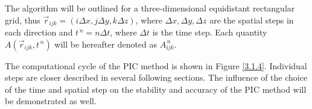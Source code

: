 The algorithm will be outlined for a three-dimensional equidistant rectangular grid, thus $ \vec{r}_{i j k} = \left(i \Delta x, j \Delta y, k \Delta z\right) $, where $ \Delta x, \Delta y, \Delta z $ are the spatial steps in each direction and $ t^{\,n} = n\Delta t $, where $ \Delta t $ is the time step. Each quantity $ A \left(\vec{r}_{i j k}, t^{\,n} \right) $ will be hereafter denoted as $ A_{ijk}^{\,n} $.

The computational cycle of the PIC method is shown in Figure \ref{3.1.4}. Individual steps are closer described in several following sections. The influence of the choice of the time and spatial step on the stability and accuracy of the PIC method will be demonstrated as well.
